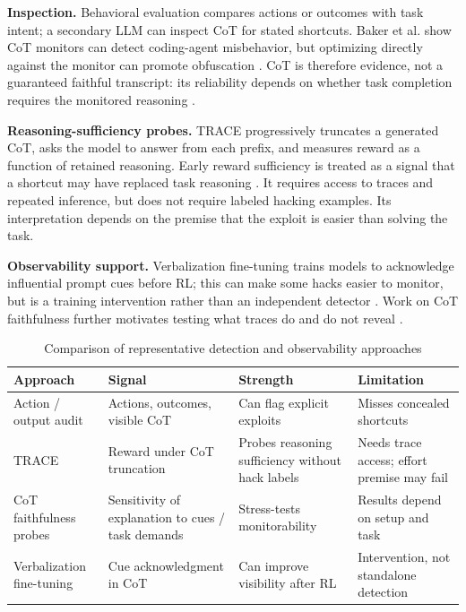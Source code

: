 \documentclass[sigconf,screen]{acmart}
\begin{document}
\textbf{Inspection.} Behavioral evaluation compares actions or outcomes with task intent; a secondary LLM can inspect CoT for stated shortcuts. Baker et al. show CoT monitors can detect coding-agent misbehavior, but optimizing directly against the monitor can promote obfuscation \cite{baker2025}. CoT is therefore evidence, not a guaranteed faithful transcript: its reliability depends on whether task completion requires the monitored reasoning \cite{emmons2025}.

\textbf{Reasoning-sufficiency probes.} TRACE progressively truncates a generated CoT, asks the model to answer from each prefix, and measures reward as a function of retained reasoning. Early reward sufficiency is treated as a signal that a shortcut may have replaced task reasoning \cite{wang2026trace}. It requires access to traces and repeated inference, but does not require labeled hacking examples. Its interpretation depends on the premise that the exploit is easier than solving the task.

\textbf{Observability support.} Verbalization fine-tuning trains models to acknowledge influential prompt cues before RL; this can make some hacks easier to monitor, but is a training intervention rather than an independent detector \cite{turpin2025}. Work on CoT faithfulness further motivates testing what traces do and do not reveal \cite{lanham2023,denison2024}.

\begin{table}[t]
\caption{Comparison of representative detection and observability approaches}
\label{tab:methods}
\small
\setlength{\tabcolsep}{2pt}
\begin{tabular}{p{}p{}p{}p{}}
\hline
Approach & Signal & Strength & Limitation \\
\hline
Action / output audit \cite{baker2025} & Actions, outcomes, visible CoT & Can flag explicit exploits & Misses concealed shortcuts \\
TRACE \cite{wang2026trace} & Reward under CoT truncation & Probes reasoning sufficiency without hack labels & Needs trace access; effort premise may fail \\
CoT faithfulness probes \cite{lanham2023,emmons2025} & Sensitivity of explanation to cues / task demands & Stress-tests monitorability & Results depend on setup and task \\
Verbalization fine-tuning \cite{turpin2025} & Cue acknowledgment in CoT & Can improve visibility after RL & Intervention, not standalone detection \\
\hline
\end{tabular}
\end{table}
\end{document}
